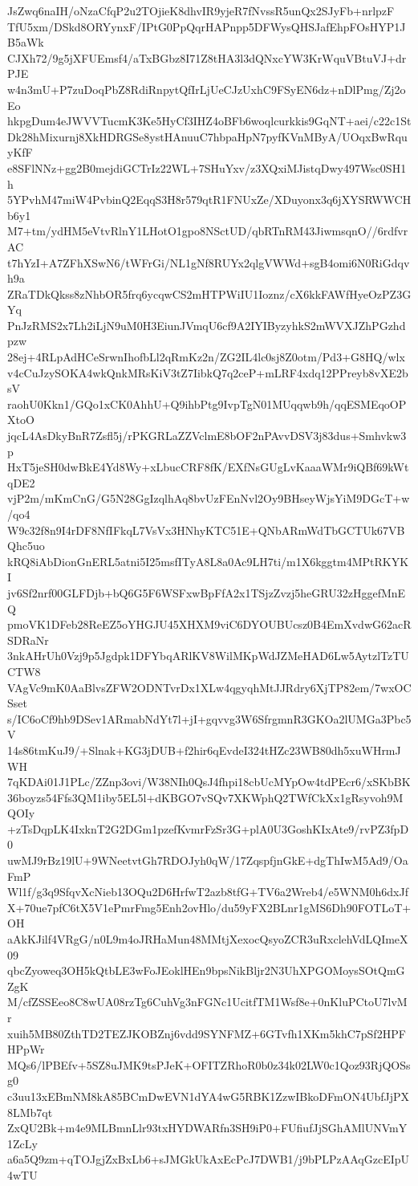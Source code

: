 JsZwq6naIH/oNzaCfqP2u2TOjieK8dhvIR9yjeR7fNvssR5unQx2SJyFb+nrlpzF
TfU5xm/DSkd8ORYynxF/IPtG0PpQqrHAPnpp5DFWysQHSJafEhpFOsHYP1JB5aWk
CJXh72/9g5jXFUEmsf4/aTxBGbz8I71Z8tHA3l3dQNxcYW3KrWquVBtuVJ+drPJE
w4n3mU+P7zuDoqPbZ8RdiRnpytQfIrLjUeCJzUxhC9FSyEN6dz+nDlPmg/Zj2oEo
hkpgDum4eJWVVTucmK3Ke5HyCf3IHZ4oBFb6woqlcurkkis9GqNT+aei/c22c1St
Dk28hMixurnj8XkHDRGSe8ystHAnuuC7hbpaHpN7pyfKVnMByA/UOqxBwRquyKfF
e8SFlNNz+gg2B0mejdiGCTrIz22WL+7SHuYxv/z3XQxiMJistqDwy497Wsc0SH1h
5YPvhM47miW4PvbinQ2EqqS3H8r579qtR1FNUxZe/XDuyonx3q6jXYSRWWCHb6y1
M7+tm/ydHM5eVtvRlnY1LHotO1gpo8NSctUD/qbRTnRM43JiwmsqnO//6rdfvrAC
t7hYzI+A7ZFhXSwN6/tWFrGi/NL1gNf8RUYx2qlgVWWd+sgB4omi6N0RiGdqvh9a
ZRaTDkQkss8zNhbOR5frq6ycqwCS2mHTPWiIU1Ioznz/cX6kkFAWfHyeOzPZ3GYq
PnJzRMS2x7Lh2iLjN9uM0H3EiunJVmqU6cf9A2IYIByzyhkS2mWVXJZhPGzhdpzw
28ej+4RLpAdHCeSrwnIhofbLl2qRmKz2n/ZG2IL4lc0sj8Z0otm/Pd3+G8HQ/wlx
v4cCuJzySOKA4wkQnkMRsKiV3tZ7IibkQ7q2ceP+mLRF4xdq12PPreyb8vXE2bsV
raohU0Kkn1/GQo1xCK0AhhU+Q9ihbPtg9IvpTgN01MUqqwb9h/qqESMEqoOPXtoO
jqcL4AsDkyBnR7Zsfl5j/rPKGRLaZZVclmE8bOF2nPAvvDSV3j83dus+Smhvkw3p
HxT5jeSH0dwBkE4Yd8Wy+xLbucCRF8fK/EXfNsGUgLvKaaaWMr9iQBf69kWtqDE2
vjP2m/mKmCnG/G5N28GgIzqlhAq8bvUzFEnNvl2Oy9BHseyWjsYiM9DGcT+w/qo4
W9c32f8n9I4rDF8NfIFkqL7VsVx3HNhyKTC51E+QNbARmWdTbGCTUk67VBQhc5uo
kRQ8iAbDionGnERL5atni5I25msfITyA8L8a0Ac9LH7ti/m1X6kggtm4MPtRKYKI
jv6Sf2nrf00GLFDjb+bQ6G5F6WSFxwBpFfA2x1TSjzZvzj5heGRU32zHggefMnEQ
pmoVK1DFeb28ReEZ5oYHGJU45XHXM9viC6DYOUBUcsz0B4EmXvdwG62acRSDRaNr
3nkAHrUh0Vzj9p5Jgdpk1DFYbqARlKV8WilMKpWdJZMeHAD6Lw5AytzlTzTUCTW8
VAgVc9mK0AaBlvsZFW2ODNTvrDx1XLw4qgyqhMtJJRdry6XjTP82em/7wxOCSset
s/IC6oCf9hb9DSev1ARmabNdYt7l+jI+gqvvg3W6SfrgmnR3GKOa2lUMGa3Pbc5V
14s86tmKuJ9/+Slnak+KG3jDUB+f2hir6qEvdeI324tHZc23WB80dh5xuWHrmJWH
7qKDAi01J1PLc/ZZnp3ovi/W38NIh0QsJ4fhpi18cbUcMYpOw4tdPEcr6/xSKbBK
36boyzs54Ffs3QM1iby5EL5l+dKBGO7vSQv7XKWphQ2TWfCkXx1gRsyvoh9MQOIy
+zTsDqpLK4IxknT2G2DGm1pzefKvmrFzSr3G+plA0U3GoshKIxAte9/rvPZ3fpD0
uwMJ9rBz19lU+9WNeetvtGh7RDOJyh0qW/17ZqspfjnGkE+dgThIwM5Ad9/OaFmP
Wl1f/g3q9SfqvXcNieb13OQu2D6HrfwT2azb8tfG+TV6a2Wreb4/e5WNM0h6dxJf
X+70ue7pfC6tX5V1ePmrFmg5Enh2ovHlo/du59yFX2BLnr1gMS6Dh90FOTLoT+OH
aAkKJilf4VRgG/n0L9m4oJRHaMun48MMtjXexocQsyoZCR3uRxclehVdLQImeX09
qbcZyoweq3OH5kQtbLE3wFoJEoklHEn9bpsNikBljr2N3UhXPGOMoysSOtQmGZgK
M/cfZSSEeo8C8wUA08rzTg6CuhVg3nFGNc1UcitfTM1Wsf8e+0nKluPCtoU7lvMr
xuih5MB80ZthTD2TEZJKOBZnj6vdd9SYNFMZ+6GTvfh1XKm5khC7pSf2HPFHPpWr
MQs6/lPBEfv+5SZ8uJMK9tsPJeK+OFITZRhoR0b0z34k02LW0c1Qoz93RjQOSsg0
c3uu13xEBmNM8kA85BCmDwEVN1dYA4wG5RBK1ZzwIBkoDFmON4UbfJjPX8LMb7qt
ZxQU2Bk+m4e9MLBmnLlr93txHYDWARfn3SH9iP0+FUfiufJjSGhAMlUNVmY1ZcLy
a6a5Q9zm+qTOJgjZxBxLb6+sJMGkUkAxEcPcJ7DWB1/j9bPLPzAAqGzcEIpU4wTU
